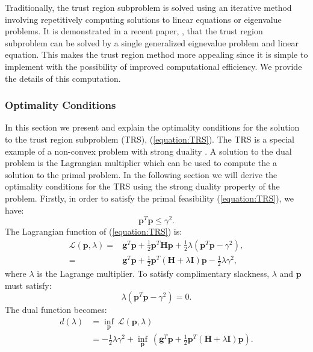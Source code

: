 \documentclass[letterpaper,12pt,titlepage,oneside,final]{book}
\begin{document}
	Traditionally, the trust region subproblem is solved using an iterative method involving repetitively computing solutions to linear equations or eigenvalue problems. It is demonstrated in a recent paper, \cite{adachi.paper}, that the trust region subproblem can be solved by a single generalized eignevalue problem and linear equation. This makes the trust region method more appealing since it is simple to implement with the possibility of improved computational efficiency. We provide the details of this computation.  
	
	\subsubsection{Optimality Conditions}
	
	In this section we present and explain the optimality conditions for the solution to the trust region subproblem (TRS), (\ref{equation:TRS}). The TRS is a special example of a non-convex problem with strong duality \cite{boyd}. A solution to the dual problem is the Lagrangian multiplier which can be used to compute the a solution to the primal problem. In the following section we will derive the optimality conditions for the TRS using the strong duality property of the problem. Firstly, in order to satisfy the primal feasibility (\ref{equation:TRS}), we have:
	\begin{equation}
	\mathbf{p}^{T}\mathbf{p} \leq \gamma^2.
	\label{equation:inbounds}
	\end{equation}
	The Lagrangian function of (\ref{equation:TRS}) is:
	\begin{equation}
	\begin{split}
	\mathcal{L}(\mathbf{p},\lambda) = &\mathbf{g}^{T}\mathbf{p} + \frac{1}{2}\mathbf{p}^{T}\mathbf{Hp} + \frac{1}{2}\lambda (\mathbf{p}^{T}\mathbf{p} - \gamma^{2}),\\ = &\mathbf{g}^{T}\mathbf{p} + \frac{1}{2}\mathbf{p}^{T}(\mathbf{H} + \lambda\mathbf{I})\mathbf{p} - \frac{1}{2}\lambda\gamma^{2},
	\label{equation:lagrangian}
	\end{split}
	\end{equation}
	where $\lambda$ is the Lagrange multiplier. To satisfy complimentary slackness, $\lambda$ and $\mathbf{p}$ must satisfy:
	\begin{equation}
	\lambda(\mathbf{p}^{T}\mathbf{p} - \gamma^{2}) = 0.
	\label{equation:complementary_slackness}
	\end{equation}
	The dual function becomes:
	\begin{equation}
	\begin{aligned}
	d(\lambda) & = \underset{\mathbf{p}}{\inf}
	\ \mathcal{L}(\mathbf{p},\lambda)  \\
	& = -\frac{1}{2}\lambda\gamma^{2} + \underset{\mathbf{p}}{\inf}
	\ (\mathbf{g}^{T}\mathbf{p} + \frac{1}{2}\mathbf{p}^{T}(\mathbf{H} + \lambda\mathbf{I})\mathbf{p}). \\
	\label{equation:dual}
	\end{aligned}
	\end{equation}
\end{document}
